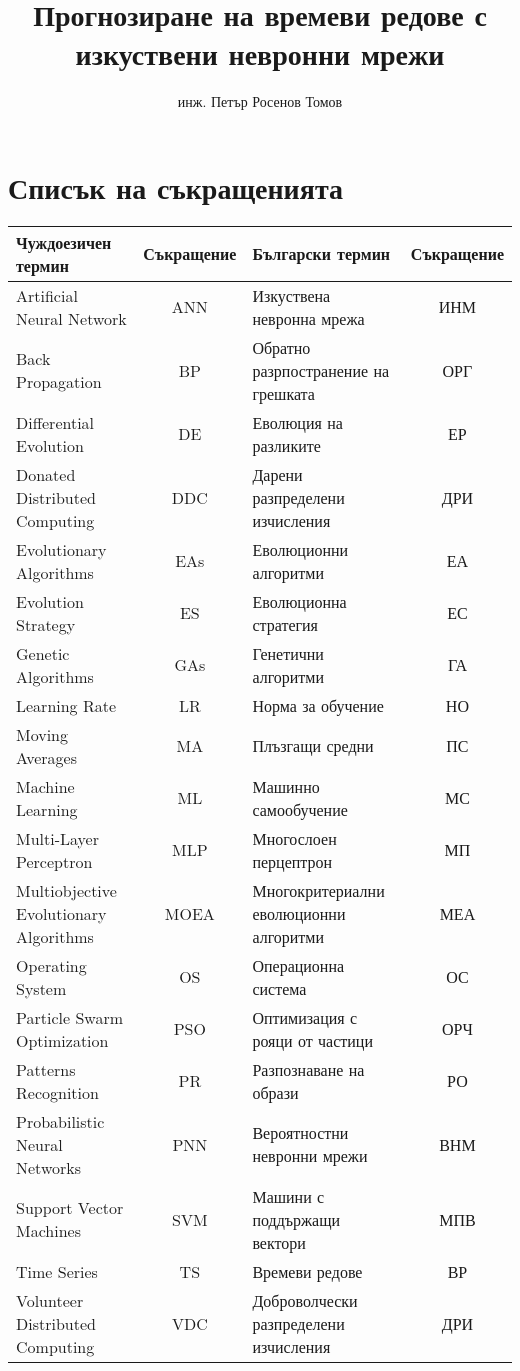 \documentclass[14pt,a4paper,openany]{book}
\title{Прогнозиране на времеви редове с изкуствени невронни мрежи}
\author{инж. Петър Росенов Томов}
\begin{document}

\thispagestyle{empty}

\setcounter{page}{1}

\tableofcontents

\chapter*{Списък на съкращенията}

\begin{longtable}{ | p{3.75cm} | c | p{3.75cm} | c | }
\hline
\cellcolor{gray!15}Чуждоезичен термин & \cellcolor{gray!15}Съкращение & \cellcolor{gray!15}Български термин & \cellcolor{gray!15}Съкращение \\ [0.05ex] 
\hline
\hline
Artificial Neural Network & ANN & Изкуствена невронна мрежа & ИНМ \\  
\hline
Back Propagation  & BP & Обратно разрпостранение на грешката & ОРГ \\  
\hline
Differential Evolution & DE & Еволюция на разликите & ЕР \\ 
\hline
Donated Distributed Computing & DDC & Дарени разпределени изчисления & ДРИ \\  
\hline
Evolutionary Algorithms & EAs & Еволюционни алгоритми & ЕА \\  
\hline
Evolution Strategy & ES & Еволюционна стратегия & ЕС \\  
\hline
Genetic Algorithms & GAs & Генетични алгоритми & ГА \\  
\hline
Learning Rate & LR & Норма за обучение & НО \\  
\hline
Moving Averages & MA & Плъзгащи средни & ПС \\  
\hline
Machine Learning & ML & Машинно самообучение & МС \\  
\hline
Multi-Layer Perceptron & MLP & Многослоен перцептрон & МП \\  
\hline
Multiobjective Evolutionary Algorithms & MOEA & Многокритериални еволюционни алгоритми & МЕА \\  
\hline
Operating System & OS & Операционна система & ОС \\  
\hline
Particle Swarm Optimization & PSO & Оптимизация с рояци от частици & ОРЧ \\  
\hline
Patterns Recognition & PR & Разпознаване на образи & РО \\  
\hline
Probabilistic Neural Networks & PNN & Вероятностни невронни мрежи & ВНМ \\  
\hline
Support Vector Machines & SVM & Машини с поддържащи вектори & МПВ \\  
\hline
Time Series & TS & Времеви редове & ВР \\  
\hline
Volunteer Distributed Computing & VDC & Доброволчески разпределени изчисления & ДРИ \\  
\hline
\end{longtable}
\end{document}
